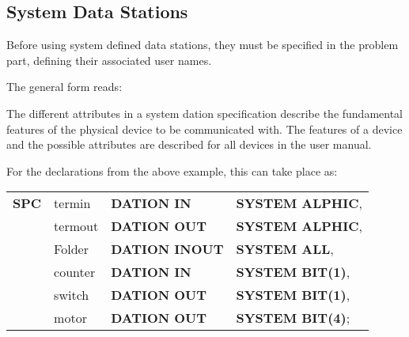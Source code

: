 \subsection{System Data Stations}   %

Before using system defined data stations, they must be specified in the
problem part, defining their associated user names. 

The general form reads:




The different attributes in a system dation specification describe the
fundamental features of the physical device to be communicated with. The
features of a device and the possible attributes are described for all
devices in the user manual.

For the declarations from the above example, this can take place as:

\begin{tabular}{llll}
{\bf SPC} & termin  & {\bf DATION IN}    & {\bf SYSTEM ALPHIC},\\
   & termout & {\bf DATION OUT}   & {\bf SYSTEM ALPHIC},\\
   & Folder  & {\bf DATION INOUT} & {\bf SYSTEM ALL},   \\
   & counter & {\bf DATION IN}    & {\bf SYSTEM BIT(1)}, \\
   & switch  & {\bf DATION OUT}   & {\bf SYSTEM BIT(1)}, \\
   & motor   & {\bf DATION OUT}   & {\bf SYSTEM BIT(4)}; \\
\end{tabular}


